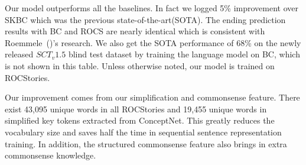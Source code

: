  
Our model outperforms all the baselines. In fact we 
logged 5\% improvement over
SKBC which was the previous state-of-the-art(SOTA). 
The ending prediction results with BC and ROCS are nearly identical  
which is consistent with Roemmele~(\citeyear{roemmele2017rnn})'s research.
We also get the SOTA performance of 68\% on the newly 
released $SCT_v1.5$ blind test dataset by training the language model on BC, 
which is not shown in this table.  
Unless otherwise noted, our model is trained on ROCStories.


Our improvement comes from our simplification and commonsense feature. 
There exist 43,095 unique words in all ROCStories and 
19,455 unique words in simplified key tokens extracted from ConceptNet. 
This greatly reduces the vocabulary size and saves half the time in sequential sentence 
representation training. In addition, the structured commonsense feature 
also brings in extra commonsense knowledge. 

